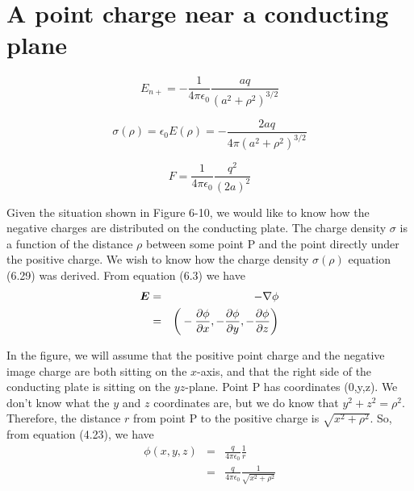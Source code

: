 \section{A point charge near a conducting plane}

\begin{equation}
  E_{n+} = - \frac{1}{4\pi\epsilon_0} \frac{aq}{(a^2 + \rho^2)^{3/2}}
\end{equation}

\begin{equation}
  \sigma(\rho) = \epsilon_0 E (\rho) = - \frac{2aq}{4 \pi (a^2 + \rho^2)^{3/2}}
\end{equation}

\begin{equation}
  F = \frac{1}{4\pi\epsilon_0} \frac{q^2}{(2a)^2}
\end{equation}



Given the situation shown in Figure 6-10,
we would like to know how the negative charges are distributed on the conducting plate.
The charge density $\sigma$ is a function of the distance $\rho$ 
between some point P and the point directly under the positive charge.
We wish to know how the charge density $\sigma(\rho)$ equation (6.29) was derived.
From equation (6.3) we have
\begin{eqnarray}
  \boldsymbol{E} &=& -\nabla\phi \nonumber\\
  &=& \bigg( -\frac{\partial \phi}{\partial x} , -\frac{\partial \phi}{\partial y} , -\frac{\partial \phi}{\partial z} \bigg) \nonumber
\end{eqnarray}

In the figure, we will assume that the positive point charge and the negative image charge
are both sitting on the $x$-axis, and that the right side of the conducting plate is 
sitting on the $yz$-plane.  Point P has coordinates (0,y,z).
We don't know what the $y$ and $z$ coordinates are, but we do know that $y^2+z^2=\rho^2$.
Therefore, the distance $r$ from point P to the positive charge is $\sqrt{x^2+\rho^2}$.
So, from equation (4.23), we have
\begin{eqnarray}
  \phi(x,y,z) &=& \frac{q}{4\pi\epsilon_0} \frac{1}{r} \nonumber\\
  &=& \frac{q}{4\pi\epsilon_0} \frac{1}{\sqrt{x^2+\rho^2}} \nonumber
\end{eqnarray}

